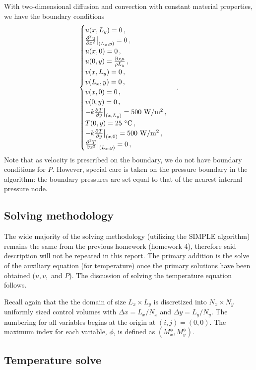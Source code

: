 \documentclass{article}
\begin{document}
With two-dimensional diffusion and convection with constant material properties, we have the boundary conditions
\begin{equation}
\begin{cases}
u(x, L_y) = 0\,, \\
\pdv{^2u}{x^2} \big|_{(L_x, y)} = 0 \,, \\
u(x, 0) = 0 \,, \\
u(0, y) = \frac{\mathrm{Re} \mu}{\rho L_y} \,, \\
v(x, L_y) = 0\,, \\
v(L_x, y) = 0 \,, \\
v(x, 0) = 0\,, \\
v(0, y) = 0 \,,\\
-k\pdv{T}{y} \big|_{(x, L_y)} = 500~\text{W}/\text{m}^2\,,\\
T(0, y) = 25~^\circ\text{C}\,, \\
-k\pdv{T}{y} \big|_{(x, 0)} = 500~\text{W}/\text{m}^2\,,\\
\pdv{^2T}{x^2}\big|_{(L_x, y)} = 0\,,
\end{cases}\,.
\end{equation}
Note that as velocity is prescribed on the boundary, we do not have boundary conditions for $P$. However, special care is taken on the pressure boundary in the algorithm: the boundary pressures are set equal to that of the nearest internal pressure node.

\subsection{Solving methodology}

The wide majority of the solving methodology (utilizing the SIMPLE algorithm) remains the same from the previous homework (homework 4), therefore said description will not be repeated in this report. The primary addition is the solve of the auxiliary equation (for temperature) once the primary solutions have been obtained ($u, v,$ and $P$). The discussion of solving the temperature equation follows.

Recall again that the the domain of size $L_x \times L_y$ is discretized into $N_x \times N_y$ uniformly sized control volumes with $\Delta x = L_x / N_x$ and $\Delta y = L_y / N_y$. The numbering for all variables begins at the origin at $(i, j) = (0, 0)$. The maximum index for each variable, $\phi$, is defined as $(M_x^\phi, M_y^\phi)$.

\subsection{Temperature solve}
\end{document}
